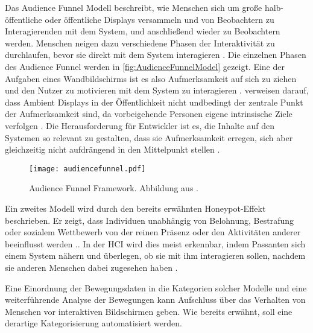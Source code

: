 Das Audience Funnel Modell \citep{wouters_uncovering_2016, mai_audience_2018} beschreibt,
wie Menschen sich um große halb-öffentliche oder öffentliche Displays versammeln
und von Beobachtern zu Interagierenden mit dem System, und anschließend wieder zu Beobachtern werden.
Menschen neigen dazu verschiedene Phasen der Interaktivität zu durchlaufen,
bevor sie direkt mit dem System interagieren \citep{wouters_uncovering_2016, mai_audience_2018}.
Die einzelnen Phasen des Audience Funnel werden in \autoref{fig:AudienceFunnelModel} gezeigt.
Eine der Aufgaben eines Wandbildschirms ist es also Aufmerksamkeit auf sich zu ziehen
und den Nutzer zu motivieren mit dem System zu interagieren \citep{mai_audience_2018}.
\citet{mai_audience_2018} verweisen darauf, dass Ambient Displays in der Öffentlichkeit
nicht undbedingt der zentrale Punkt der Aufmerksamkeit sind, da vorbeigehende Personen eigene intrinsische Ziele verfolgen \citep{mai_audience_2018}.
Die Herausforderung für Entwickler ist es, die Inhalte auf den Systemen so relevant zu gestalten,
dass sie Aufmerksamkeit erregen, sich aber gleichzeitig nicht aufdrängend in den Mittelpunkt stellen \citep{mai_audience_2018}.
\begin{figure}[ht]
    \begin{center}
    \texttt{[image: audiencefunnel.pdf]}
    \end{center}
    \caption{Audience Funnel Framework. Abbildung aus \citet{mai_audience_2018}.}
    \label{fig:AudienceFunnelModel}
  \end{figure}

Ein zweites Modell wird durch den bereits erwähnten Honeypot-Effekt beschrieben.
Er zeigt, dass Individuen unabhängig von Belohnung, Bestrafung oder sozialem Wettbewerb
von der reinen Präsenz oder den Aktivitäten anderer beeinflusst werden \citep{wouters_uncovering_2016}..
In der \ac{HCI} wird dies meist erkennbar, indem Passanten sich einem System nähern
und überlegen, ob sie mit ihm interagieren sollen,
nachdem sie anderen Menschen dabei zugesehen haben \citep{wouters_uncovering_2016}.

Eine Einordnung der Bewegungsdaten in die Kategorien solcher Modelle
und eine weiterführende Analyse der Bewegungen kann Aufschluss über das Verhalten von Menschen
vor interaktiven Bildschirmen geben.
Wie bereits erwähnt, soll eine derartige Kategorisierung automatisiert werden.

